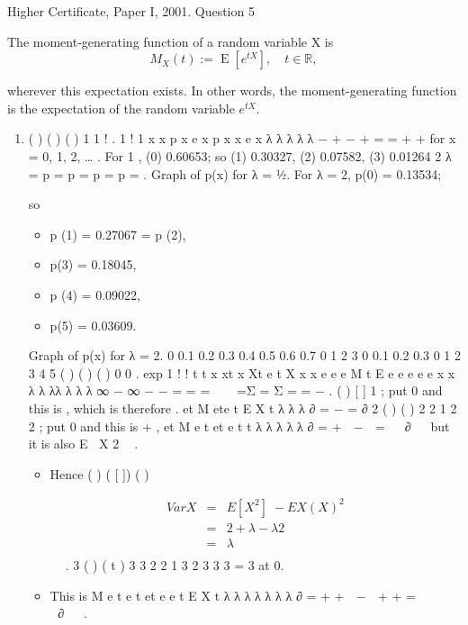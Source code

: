 \documentclass[a4paper,12pt]{article}
\begin{document}
Higher Certificate, Paper I, 2001. Question 5



\begin{framed}
\noindent The moment-generating function of a random variable X is 
\[{\displaystyle M_{X}(t):=\operatorname {E} \left[e^{tX}\right],\quad t\in \mathbb {R} ,} \]

\noindent wherever this expectation exists. In other words, the moment-generating function is the expectation of the random variable 
${\displaystyle e^{tX}}. $
\end{framed}

\begin{enumerate}
\item ( )
( ) ( )
1 1 ! .
1 ! 1
x
x
p x e x
p x x e x
λ
λ
λ λ
λ
− +
−
+
= =
+ +
for x = 0, 1, 2, … .
For 1 , (0) 0.60653; so (1) 0.30327, (2) 0.07582, (3) 0.01264
2
λ = p = p = p = p = .
Graph of p(x) for λ = ½.
For λ = 2, p(0) = 0.13534;

so
\begin{itemize}
\item p (1) = 0.27067 = p (2), 
\item p(3) = 0.18045, 
\item p (4) = 0.09022,
\item p(5) = 0.03609.
\end{itemize}

Graph of p(x) for λ = 2.
0
0.1
0.2
0.3
0.4
0.5
0.6
0.7
0 1 2 3
0
0.1
0.2
0.3
0 1 2 3 4 5
( ) ( ) ( { })
0 0
. exp 1
! !
t
t x xt x
Xt e t
X
x x
e e e M t E e e e e e
x x
λ
λ λλ λ λ λ
∞ − ∞
− −
= =
=   =Σ = Σ = = − .
( ) [ ] 1 ; put 0 and this is , which is therefore .
et M ete t E X
t
λ λ λ ∂ = − =
∂
2 ( ) ( )
2 2 1 2
2 ; put 0 and this is + ,
et M e t et e t
t
λ λ λ λ λ ∂ = +  −  =  
∂  
but it is also E X 2  .
\begin{itemize}
\item Hence ( ) ( [ ]) ( ) 


\begin{eqnarray}
Var X &=& E[X^2]  − E X(X)^2 \\
&=&  2 +λ − λ 2 \\
&=& \lambda\\
\end{eqnarray}  .
3 ( ) ( t )
3 3 2 2 1 3 2 3
3 3 = 3 at 0.
\item This is M e t e t et e e t E X
t
λ λ λ λ λ λ λ ∂ = + +  −  + + =       ∂  
.


\end{itemize}
\end{enumerate}
\end{document}

